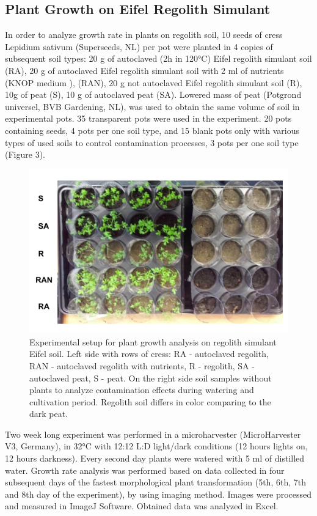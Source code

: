 \documentclass[preprint]{elsarticle}
\begin{document}
\subsection{Plant Growth on Eifel Regolith Simulant}
In order to analyze growth rate in plants on regolith soil, 10 seeds of cress Lepidium sativum (Superseeds, NL) per pot were planted in 4 copies of subsequent soil types: 20 g of autoclaved (2h in 120°C) Eifel regolith simulant soil (RA), 20 g of autoclaved Eifel regolith simulant soil with 2 ml of nutrients (KNOP medium \cite{ref17}), (RAN), 20 g not autoclaved Eifel regolith simulant soil (R), 10g of peat (S), 10 g of autoclaved peat (SA). Lowered mass of peat (Potgrond universel, BVB Gardening, NL), was used to obtain the same volume of soil in experimental pots. 35 transparent pots were used in the experiment. 20 pots containing seeds, 4 pots per one soil type, and 15 blank pots only with various types of used soils to control contamination processes, 3 pots per one soil type (Figure 3).

\begin{figure}
\centering
\includegraphics{img/figure03.png}
\caption{Experimental setup for plant growth analysis on regolith simulant Eifel soil. Left side with rows of cress: RA - autoclaved regolith, RAN - autoclaved regolith with nutrients, R - regolith, SA - autoclaved peat, S - peat. On the right side soil samples without plants to analyze contamination effects during watering and cultivation period. Regolith soil differs in color comparing to the dark peat.}
\label{fig:f03}
\end{figure}

Two week long experiment was performed in a microharvester (MicroHarvester V3, Germany), in 32°C with 12:12 L:D light/dark conditions (12 hours lights on, 12 hours darkness). Every second day plants were watered with 5 ml of distilled water. Growth rate analysis was performed based on data collected in four subsequent days of the fastest morphological plant transformation (5th, 6th, 7th and 8th day of the experiment), by using imaging method. Images were processed and measured in ImageJ Software. Obtained data was analyzed in Excel.
\end{document}
